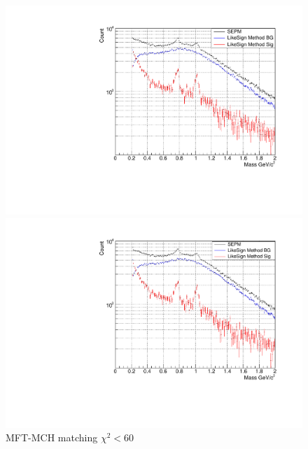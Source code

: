 \begin{figure}[htbp]
\begin{minipage}{0.45\textwidth}
                    \label{fig:chi2_40}
                \end{minipage}
                \\
                \vspace{1em}
                \begin{minipage}{0.45\textwidth}
                    \centering
                    \includegraphics[width=\textwidth]{fig/3_4_4_chi2_60.pdf}
                    \captionsetup{labelformat=empty}
                    \caption{MFT-MCH matching $\chi^2 < 60$}
                    \label{fig:chi2_60}
                \end{minipage}
                \hfill
                \begin{minipage}{0.45\textwidth}
                    \centering
                    \includegraphics[width=\textwidth]{fig/3_4_4_chi2_80.pdf}

\end{minipage}
\end{figure}
